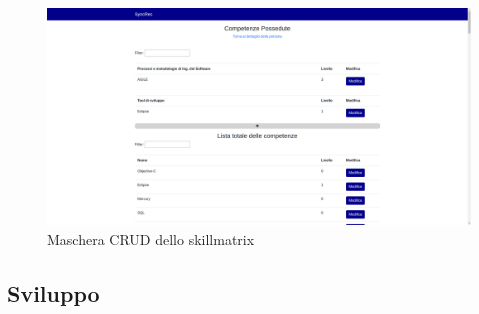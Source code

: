 \vspace{0.5em}
\begin{figure}[!h] 
	\centering 
	\includegraphics[width=1\columnwidth]{immagini/svil/skillmatrix} 
	\caption{Maschera CRUD dello skillmatrix}
	\label{figura:skillmatrix}
\end{figure}


\subsection{Sviluppo}
